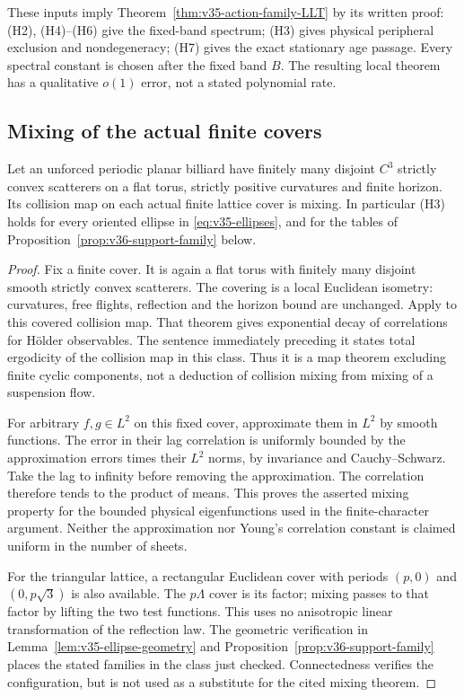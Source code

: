 These inputs imply Theorem~\ref{thm:v35-action-family-LLT} by its
written proof: (H2), (H4)--(H6) give the fixed-band spectrum; (H3)
gives physical peripheral exclusion and nondegeneracy; (H7) gives the
exact stationary age passage. Every spectral constant is chosen after
the fixed band $B$. The resulting local theorem has a qualitative
$o(1)$ error, not a stated polynomial rate.

\subsection{Mixing of the actual finite covers}
\begin{proposition}
\label{prop:v36-cover-mixing}
Let an unforced periodic planar billiard have finitely many disjoint
$C^3$ strictly convex scatterers on a flat torus, strictly positive
curvatures and finite horizon. Its collision map on each actual finite
lattice cover is mixing. In particular \textup{(H3)} holds for every
oriented ellipse in \eqref{eq:v35-ellipses}, and for the tables of
Proposition~\ref{prop:v36-support-family} below.
\end{proposition}
\begin{proof}
Fix a finite cover. It is again a flat torus with finitely many disjoint
smooth strictly convex scatterers. The covering is a local Euclidean
isometry: curvatures, free flights, reflection and the horizon bound
are unchanged. Apply \cite[Section 8.1, Theorem 6(b)]{Young} to this
covered collision map. That theorem gives exponential decay of
correlations for H\"older observables. The sentence immediately
preceding it states total ergodicity of the collision map in this
class. Thus it is a map theorem excluding finite cyclic components,
not a deduction of collision mixing from mixing of a suspension flow.

For arbitrary $f,g\in L^2$ on this fixed cover, approximate them in
$L^2$ by smooth functions. The error in their lag correlation is
uniformly bounded by the approximation errors times their $L^2$
norms, by invariance and Cauchy--Schwarz. Take the lag to infinity
before removing the approximation. The correlation therefore tends
to the product of means. This proves the asserted mixing property
for the bounded physical eigenfunctions used in the finite-character
argument. Neither the approximation nor Young's correlation constant
is claimed uniform in the number of sheets.

For the triangular lattice, a rectangular Euclidean cover with periods
$(p,0)$ and $(0,p\sqrt3)$ is also available. The $p\Lambda$ cover is
its factor; mixing passes to that factor by lifting the two test
functions. This uses no anisotropic linear transformation of the
reflection law. The geometric verification in
Lemma~\ref{lem:v35-ellipse-geometry} and
Proposition~\ref{prop:v36-support-family} places the stated families
in the class just checked. Connectedness verifies the configuration,
but is not used as a substitute for the cited mixing theorem.
\end{proof}

